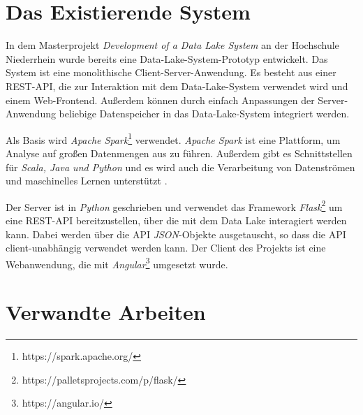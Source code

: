 \section{Das Existierende System}
In dem Masterprojekt \textit{Development of a Data Lake System} \parencite{datalake_proj} an der Hochschule Niederrhein wurde bereits eine Data-Lake-System-Prototyp entwickelt.
Das System ist eine monolithische Client-Server-Anwendung.
Es besteht aus einer REST-API, die zur Interaktion mit dem Data-Lake-System verwendet wird und einem Web-Frontend.
Außerdem können durch einfach Anpassungen der Server-Anwendung beliebige Datenspeicher in das Data-Lake-System integriert werden.

Als Basis wird \textit{Apache Spark}\footnote{https://spark.apache.org/} verwendet.
\textit{Apache Spark} ist eine Plattform, um Analyse auf großen Datenmengen aus zu führen.
Außerdem gibt es Schnittstellen für \textit{Scala, Java und Python} und es wird auch die Verarbeitung von Datenströmen und maschinelles Lernen unterstützt \parencite{spark}.

Der Server ist in \textit{Python} geschrieben und verwendet das Framework \textit{Flask}\footnote{https://palletsprojects.com/p/flask/} um eine REST-API bereitzustellen, über die mit dem Data Lake interagiert werden kann.
Dabei werden über die API \textit{JSON}-Objekte ausgetauscht, so dass die API client-unabhängig verwendet werden kann.
Der Client des Projekts ist eine Webanwendung, die mit \textit{Angular}\footnote{https://angular.io/} umgesetzt wurde.

\section{Verwandte Arbeiten}